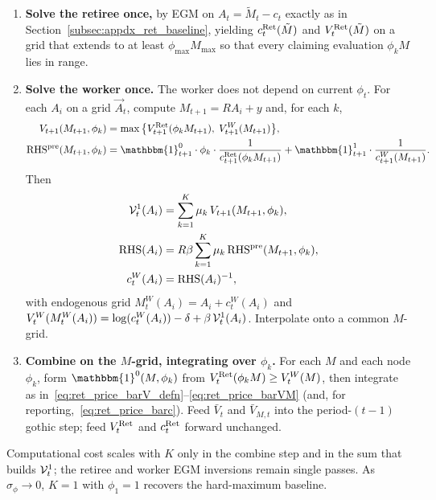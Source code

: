 \begin{enumerate}
	\item \textbf{Solve the retiree once,} by EGM on $A_t=\tilde M_t-c_t$ exactly as in Section~\ref{subsec:appdx_ret_baseline}, yielding $c_t^{\mathrm{Ret}}(\tilde M)$ and $V_t^{\mathrm{Ret}}(\tilde M)$ on a grid that extends to at least $\phi_{\max}M_{\max}$ so that every claiming evaluation $\phi_k M$ lies in range.
	\item \textbf{Solve the worker once.} The worker does not depend on current $\phi_t$. For each $A_i$ on a grid $\vec A_t$, compute $M_{t+1}=R A_i+y$ and, for each $k$,
	\begin{align}
		V_{t+1}(M_{t+1},\phi_k)
		&= \max\big\{
			V_{t+1}^{\Ret}(\phi_k M_{t+1}),\;
			V_{t+1}^{W}(M_{t+1})
		\big\},
		\\
		\mathrm{RHS}^{\mathrm{pre}}(M_{t+1},\phi_k)
		&= \mathbbm{1}_{t+1}^{0}\cdot\phi_k\cdot\frac{1}{c_{t+1}^{\Ret}(\phi_k M_{t+1})}
		+\mathbbm{1}_{t+1}^{1}\cdot\frac{1}{c_{t+1}^{W}(M_{t+1})}.
	\end{align}
	Then
	\begin{align}
		\mathcal{V}_t^{1}(A_i)
		&= \sum_{k=1}^{K}\mu_k\,V_{t+1}(M_{t+1},\phi_k),
		\\
		\mathrm{RHS}(A_i)
		&= R\beta\sum_{k=1}^{K}\mu_k\,\mathrm{RHS}^{\mathrm{pre}}(M_{t+1},\phi_k),
		\\
		c_t^{W}(A_i)
		&= \mathrm{RHS}(A_i)^{-1},
	\end{align}
	with endogenous grid $M_t^{W}(A_i)=A_i+c_t^{W}(A_i)$ and
	$V_t^{W}(M_t^{W}(A_i))=\log(c_t^{W}(A_i))-\delta+\beta\,\mathcal{V}_t^{1}(A_i)$. Interpolate onto a common $M$-grid.
	\item \textbf{Combine on the $M$-grid, integrating over $\phi_k$.} For each $M$ and each node $\phi_k$, form $\mathbbm{1}^{0}(M,\phi_k)$ from $V_t^{\mathrm{Ret}}(\phi_k M)\ge V_t^{W}(M)$, then integrate as in~\eqref{eq:ret_price_barV_defn}--\eqref{eq:ret_price_barVM} (and, for reporting,~\eqref{eq:ret_price_barc}). Feed $\bar V_t$ and $\bar V_{M,t}$ into the period-$(t-1)$ gothic step; feed $V_t^{\mathrm{Ret}}$ and $c_t^{\mathrm{Ret}}$ forward unchanged.
\end{enumerate}
Computational cost scales with $K$ only in the combine step and in the sum that builds $\mathcal{V}_t^{1}$; the retiree and worker EGM inversions remain single passes. As $\sigma_\phi\to 0$, $K=1$ with $\phi_1=1$ recovers the hard-maximum baseline.

